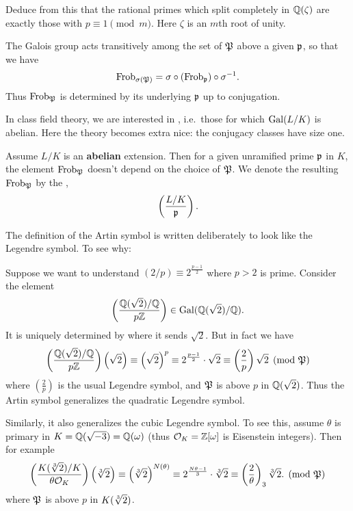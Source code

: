 \begin{exercise}
	Deduce from this that the rational primes which split completely
	in $\mathbb Q(\zeta)$ are exactly those with $p \equiv 1 \pmod m$.
	Here $\zeta$ is an $m$th root of unity.
\end{exercise}

The Galois group acts transitively among the set of $\mathfrak P$ above a given $\mathfrak p$,
so that we have
\[ \mathrm{Frob}_{\sigma(\mathfrak P)} = \sigma \circ (\mathrm{Frob}_{\mathfrak p}) \circ \sigma^{-1}.  \]
Thus $\mathrm{Frob}_\mathfrak P$ is determined by its underlying $\mathfrak p$ up to conjugation.

In class field theory, we are interested in ,
i.e.\ those for which $\operatorname{Gal}(L/K)$ is abelian.
Here the theory becomes extra nice:
the conjugacy classes have size one.
\begin{definition}
	Assume $L/K$ is an \textbf{abelian} extension.
	Then for a given unramified prime $\mathfrak p$ in $K$,
	the element $\mathrm{Frob}_\mathfrak P$ doesn't depend on the choice of $\mathfrak P$.
	We denote the resulting $\mathrm{Frob}_\mathfrak P$ by the ,
	\[ \left( \frac{L/K}{\mathfrak p} \right). \]
\end{definition}
The definition of the Artin symbol is written deliberately to
look like the Legendre symbol.
To see why:
\begin{example}
	Suppose we want to understand
	$(2/p) \equiv 2^{\frac{p-1}{2}}$ where $p > 2$ is prime.
	Consider the element
	\[ \left( \frac{\mathbb Q(\sqrt 2)/\mathbb Q}{p\mathbb Z} \right)
		\in \operatorname{Gal}(\mathbb Q(\sqrt 2) / \mathbb Q). \]
	It is uniquely determined by where it sends $\sqrt 2$.
	But in fact we have
	\[
		\left( \frac{\mathbb Q(\sqrt 2)/\mathbb Q}{p\mathbb Z} \right) \left( \sqrt 2 \right)
		\equiv \left( \sqrt 2 \right)^{p}
		\equiv 2^{\frac{p-1}{2}} \cdot \sqrt 2
		\equiv \left( \frac 2p \right) \sqrt 2
		\pmod{\mathfrak P}
	\]
	where $\left( \frac 2p \right)$ is the usual Legendre symbol,
	and $\mathfrak P$ is above $p$ in $\mathbb Q(\sqrt 2)$.
	Thus the Artin symbol generalizes the quadratic Legendre symbol.
\end{example}
\begin{example}
	Similarly, it also generalizes the cubic Legendre symbol.
	To see this, assume $\theta$ is primary in $K = \mathbb Q(\sqrt{-3}) = \mathbb Q(\omega)$
	(thus $\mathcal O_K = \mathbb Z[\omega]$ is Eisenstein integers).
	Then for example
	\[
		\left( \frac{K(\sqrt[3]{2})/K}{\theta \mathcal O_K} \right) \left( \sqrt[3]{2} \right)
		\equiv \left( \sqrt[3]{2} \right)^{N(\theta)}
		\equiv 2^{\frac{N\theta-1}{3}} \cdot \sqrt[3]{2}
		\equiv \left( \frac{2}{\theta} \right)_3 \sqrt[3]{2}.
		\pmod{\mathfrak P}
	\]
	where $\mathfrak P$ is above $p$ in $K(\sqrt[3]{2})$.
\end{example}

